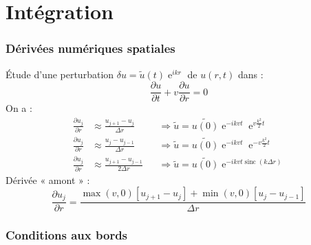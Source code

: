 \documentclass[french]{beamer}
\DeclareMathOperator{\sinc}{sinc}
\DeclareMathOperator{\e}{e}
\begin{document}
















\section{Intégration}

\begin{frame}
    \frametitle{Dérivées numériques spatiales}
    Étude d’une perturbation $\delta{u} = \tilde{u}(t) \e^{ikr}$ de $u(r,t)$ dans :
    \begin{equation*}
        \frac{\partial u}{\partial t} + v \frac{\partial u}{\partial r} = 0
    \end{equation*}
    On a :
    \begin{align*}
        \frac{\partial u_j}{\partial r} &\approx \frac{u_{j+1} - u_j    }{  \Delta{r}} &&\Rightarrow \tilde{u} = \tilde{u(0)} \e^{-i k v t} \e^{ v\frac{k^2}{2}t}\\
        \frac{\partial u_j}{\partial r} &\approx \frac{u_j     - u_{j-1}}{  \Delta{r}} &&\Rightarrow \tilde{u} = \tilde{u(0)} \e^{-i k v t} \e^{-v\frac{k^2}{2}t}\\
        \frac{\partial u_j}{\partial r} &\approx \frac{u_{j+1} - u_{j-1}}{2 \Delta{r}} &&\Rightarrow \tilde{u} = \tilde{u(0)} \e^{-i k v t \sinc(k \Delta{r})}
    \end{align*}
    Dérivée « amont » :
    \begin{equation*}
        \frac{\partial u_j}{\partial r} = \frac{\max(v,0) \left[u_{j+1} - u_j \right] + \min(v,0) \left[u_j - u_{j-1}\right]}{\Delta{r}}
    \end{equation*}
\end{frame}

\begin{frame}
    \frametitle{Conditions aux bords}
\end{frame}
\end{document}
